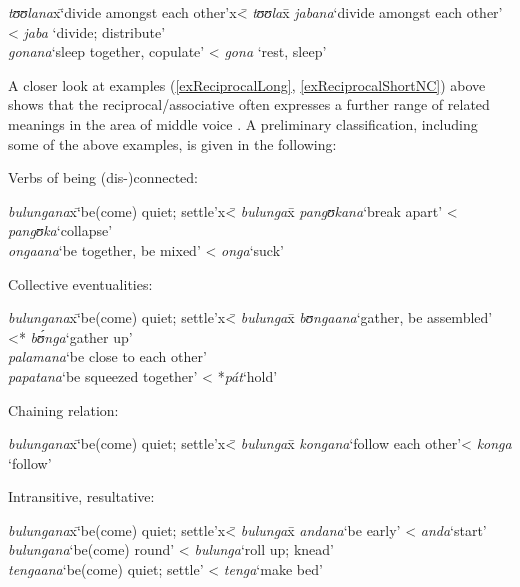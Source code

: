 \begin{exe}
	\ex\begin{tabbing}
		\textit{tʊʊlana}x\=\lq divide amongst each other'x\= < \textit{tʊʊla}x\=\kill%
		\textit{jabana}\>\lq divide amongst each other' \> < \textit{jaba} \> \lq divide; distribute'\\
		\textit{gonana}\>\lq sleep together, copulate' \> < \textit{gona} \> \lq rest, sleep'
	\end{tabbing}
\end{exe}

A closer look at examples (\ref{exReciprocalLong}, \ref{exReciprocalShortNC}) above shows that the reciprocal/associative often expresses a further range of related meanings in the area of middle voice \citep{KemmerS1993}. A preliminary classification, including some of the above examples, is given in the following:
\begin{exe}
	\ex\label{exReciprocalMiddle}\begin{xlist}
		\ex Verbs of being (dis-)connected:
		\begin{tabbing}
			\textit{bulungana}x\=\lq be(come) quiet; settle'x\= < \textit{bulunga}x\=\kill%
			\textit{pangʊkana}\>`break apart'\> < \textit{pangʊka}\>`collapse'\\
			\textit{ongaana}\>`be together, be mixed'\> < \textit{onga}\>`suck'
		\end{tabbing}
		\ex Collective eventualities:
		\begin{tabbing}
			\textit{bulungana}x\=\lq be(come) quiet; settle'x\= < \textit{bulunga}x\=\kill%
			\textit{bʊngaana}\>`gather, be assembled'\> <* \textit{bʊ́nga}\>`gather up'\\
			\textit{palamana}\>`be close to each other'\\
			\textit{papatana}\>`be squeezed together'\> < *\textit{pát}\>`hold'
		\end{tabbing}
		\ex Chaining relation:
		\begin{tabbing}
			\textit{bulungana}x\=\lq be(come) quiet; settle'x\= < \textit{bulunga}x\=\kill%
			\textit{kongana}\>\lq follow each other'\>< \textit{konga} \>\lq follow'
		\end{tabbing}
	
	\clearpage
	
		\ex Intransitive, resultative:\footnotemark
		\begin{tabbing}
			\textit{bulungana}x\=\lq be(come) quiet; settle'x\= < \textit{bulunga}x\=\kill%
			\textit{andana}\>`be early'\> < \textit{anda}\>`start'\\
			\textit{bulungana}\>`be(come) round'\> < \textit{bulunga}\>`roll up; knead'\\
			\textit{tengaana}\>\lq be(come) quiet; settle'\> < \textit{tenga}\>`make bed'
		\end{tabbing}
	\end{xlist}
\end{exe}
